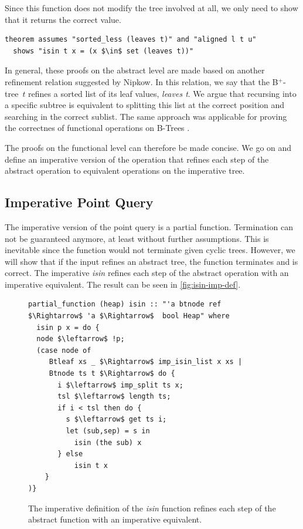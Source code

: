 \documentclass[a4paper,UKenglish,cleveref, autoref, thm-restate]{lipics-v2021}
\newcommand{\btree}{B$^+$-tree}
\begin{document}
Since this function does not modify the tree involved at all,
we only need to show that it returns the correct value.

\begin{lstlisting}[mathescape=true, language=Isabelle,label=lst:isin-set-inorder]
theorem assumes "sorted_less (leaves t)" and "aligned l t u" 
  shows "isin t x = (x $\in$ set (leaves t))"
\end{lstlisting}

In general, these proofs on the abstract level are made
based on another refinement relation suggested by Nipkow. \cite{DBLP:conf/itp/Nipkow16}
In this relation, we say that the \btree\ $t$ refines a sorted list of its leaf values, \emph{leaves t}.
We argue that recursing into a specific subtree
is equivalent to splitting this list at the correct position
and searching in the correct sublist.
The same approach was applicable for proving the correctnes of functional
operations on B-Trees \cite{DBLP:journals/afp/Mundler21}.

The proofs on the functional level can therefore be made concise.
We go on and define an imperative version of the operation that
refines each step of the abstract operation to equivalent operations on the imperative tree.

\subsection{Imperative Point Query}
\label{sec:imperative_pq}

The imperative version of the point query is a partial function.
Termination can not be guaranteed anymore,
at least without further assumptions.
This is inevitable since the function would not terminate
given cyclic trees.
However, we will show that if the input refines an abstract tree,
the function terminates and is correct.
The imperative \emph{isin} refines each step of the abstract
operation with an imperative equivalent.
The result can be seen in \autoref{fig:isin-imp-def}.

\begin{figure}
    \centering
\begin{lstlisting}[mathescape=true, language=Isabelle,label=lst:isin-imp-def]
partial_function (heap) isin :: "'a btnode ref $\Rightarrow$ 'a $\Rightarrow$  bool Heap" where
  isin p x = do {
  node $\leftarrow$ !p;
  (case node of
     Btleaf xs _ $\Rightarrow$ imp_isin_list x xs |
     Btnode ts t $\Rightarrow$ do {
       i $\leftarrow$ imp_split ts x;
       tsl $\leftarrow$ length ts;
       if i < tsl then do {
         s $\leftarrow$ get ts i;
         let (sub,sep) = s in
           isin (the sub) x
       } else
           isin t x
    }
)}
\end{lstlisting}
\caption[Definition of imperative \emph{isin}]{
    The imperative definition of the \emph{isin} function
    refines each step of the abstract function with an imperative equivalent.
}
\label{fig:isin-imp-def}
\end{figure}
\end{document}
